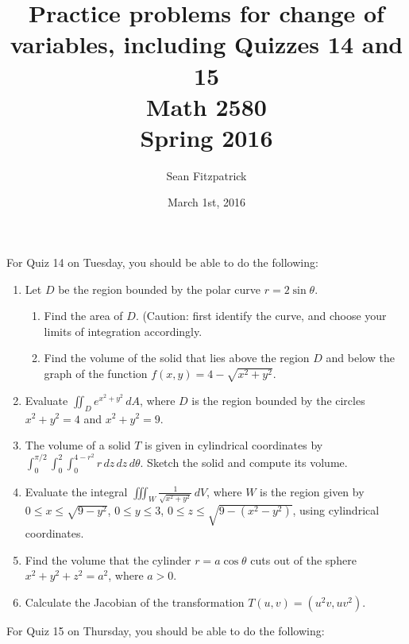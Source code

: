 \documentclass[letterpaper,12pt]{article}
\title{Practice problems for change of variables, including Quizzes 14 and 15\\Math 2580\\Spring 2016}
\author{Sean Fitzpatrick}
\date{March 1st, 2016}
\newcommand{\di}{\displaystyle}
\begin{document}
 \maketitle


For Quiz 14 on Tuesday, you should be able to do the following:

\begin{enumerate}
 \item Let $D$ be the region bounded by the polar curve $r=2\sin\theta$.
 \begin{enumerate}
 \item Find the area of $D$. (Caution: first identify the curve, and choose your limits of integration accordingly.
 \item Find the volume of the solid that lies above the region $D$ and below the graph of the function $f(x,y) = 4-\sqrt{x^2+y^2}$.
 \end{enumerate}
 \item Evaluate $\di \iint_D e^{x^2+y^2}\,dA$, where $D$ is the region bounded by the circles $x^2+y^2=4$ and $x^2+y^2=9$.
 \item The volume of a solid $T$ is given in cylindrical coordinates by $\di \int_0^{\pi/2}\int_0^2\int_0^{4-r^2}r\,dz\,dz\,d\theta$. Sketch the solid and compute its volume.
 \item Evaluate the integral $\iiint_W \frac{1}{\sqrt{x^2+y^2}}\,dV$, where $W$ is the region given by $0\leq x\leq \sqrt{9-y^2}$, $0\leq y\leq 3$, $0\leq z\leq \sqrt{9-(x^2-y^2)}$, using cylindrical coordinates.
 \item Find the volume that the cylinder $r=a\cos\theta$ cuts out of the sphere $x^2+y^2+z^2=a^2$, where $a>0$.
 \item Calculate the Jacobian of the transformation $T(u,v) = (u^2v, uv^2)$.

\end{enumerate}

\pagebreak


For Quiz 15 on Thursday, you should be able to do the following:
\end{document}
